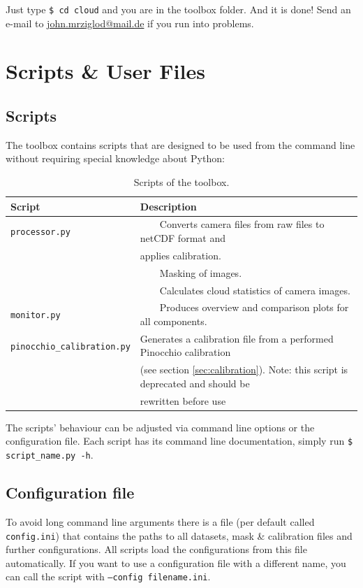 \documentclass[11pt,a4paper]{article}
\newcommand{\tabitem}{~~\llap{\textbullet}~~}
\begin{document}
Just type \texttt{\$ cd cloud} and you are in the toolbox folder. And it is done! Send an e-mail to \href{mailto:john.mrziglod@mail.de}{john.mrziglod@mail.de} if you run into problems.

\section{Scripts \& User Files}
\label{sec:scripts-and-files}
\subsection{Scripts}
\label{sec:scripts}
The \cloud toolbox contains scripts that are designed to be used from the command line without requiring special knowledge about Python:

\begin{table}[h!]
	\centering
	\caption{Scripts of the \cloud toolbox.}
	\begin{tabular}{|l|l|}
	\hline 
	\textbf{Script} & \textbf{Description}\\ 
	\hline \hline 
	\texttt{processor.py} & \tabitem Converts camera files from raw files to netCDF format and\\ 
	& applies calibration.\\
	& \tabitem Masking of images.\\
	& \tabitem Calculates cloud statistics of camera images.\\ 
	\hline 
	\texttt{monitor.py} & \tabitem Produces overview and comparison plots for all components.\\ 
	\hline 
	\texttt{pinocchio\_calibration.py} &  Generates a calibration file from a performed Pinocchio calibration\\
	& (see section \ref{sec:calibration}). Note: this script is deprecated and should be\\
	& rewritten before use\\
	\hline
	\end{tabular} 
\end{table}

The scripts' behaviour can be adjusted via command line options or the configuration file. Each script has its command line documentation, simply run \texttt{\$ script\_name.py -h}.

\subsection{Configuration file}
To avoid long command line arguments there is a file (per default called \texttt{config.ini}) that contains the paths to all datasets, mask \& calibration files and further configurations. All scripts load the configurations from this file automatically. If you want to use a configuration file with a different name, you can call the script with \texttt{--config filename.ini}.\\
\end{document}
